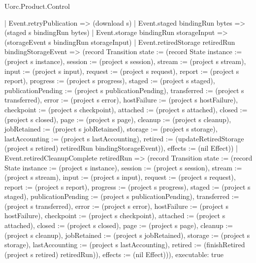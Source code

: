 \begin{lexlean}{Uorc.Product.Control}
\begin{semanticmodule}
{    | Event.retryPublication => (download s)
    | Event.staged bindingRun bytes => (staged s bindingRun bytes)
    | Event.storage bindingRun storageInput => (storageEvent s bindingRun storageInput)
    | Event.retiredStorage retiredRun bindingStorageEvent => (record Transition {state := (record State {instance := (project s instance), session := (project s session), stream := (project s stream), input := (project s input), request := (project s request), report := (project s report), progress := (project s progress), staged := (project s staged), publicationPending := (project s publicationPending), transferred := (project s transferred), error := (project s error), hostFailure := (project s hostFailure), checkpoint := (project s checkpoint), attached := (project s attached), closed := (project s closed), page := (project s page), cleanup := (project s cleanup), jobRetained := (project s jobRetained), storage := (project s storage), lastAccounting := (project s lastAccounting), retired := (updateRetiredStorage (project s retired) retiredRun bindingStorageEvent)}), effects := (nil Effect)})
    | Event.retiredCleanupComplete retiredRun => (record Transition {state := (record State {instance := (project s instance), session := (project s session), stream := (project s stream), input := (project s input), request := (project s request), report := (project s report), progress := (project s progress), staged := (project s staged), publicationPending := (project s publicationPending), transferred := (project s transferred), error := (project s error), hostFailure := (project s hostFailure), checkpoint := (project s checkpoint), attached := (project s attached), closed := (project s closed), page := (project s page), cleanup := (project s cleanup), jobRetained := (project s jobRetained), storage := (project s storage), lastAccounting := (project s lastAccounting), retired := (finishRetired (project s retired) retiredRun)}), effects := (nil Effect)})),
  executable: true
}


\end{semanticmodule}
\end{lexlean}
